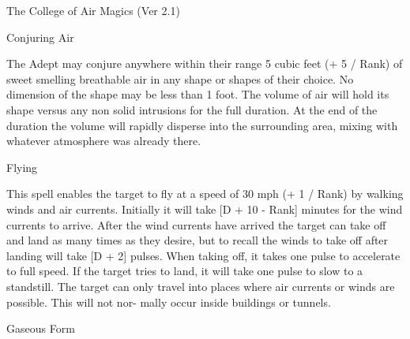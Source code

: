 \begin{Chapter}{The College of Air Magics (Ver 2.1)}
\begin{spell}[S-5]{Conjuring Air }
\begin{effects}
 The  Adept  may  conjure  anywhere  within 
their  range  5  cubic  feet  (+  5  /  Rank)  of  sweet 
smelling  breathable  air  in  any  shape  or  shapes  of 
their  choice.  No  dimension  of  the  shape  may  be 
less  than  1  foot.  The  volume  of  air  will  hold  its 
shape  versus  any  non  solid  intrusions  for  the  full 
duration. At the end of the duration the volume will 
rapidly  disperse  into  the  surrounding  area,  mixing 
with whatever atmosphere was already there. 

\end{effects}
\end{spell}

\begin{spell}[S-6]{Flying }

\begin{effects}
 This  spell  enables  the  target  to  fly  at  a 
speed  of  30  mph  (+  1  /  Rank)  by  walking  winds 
and  air  currents.  Initially  it  will  take  [D  +  10  - 
Rank]  minutes  for  the  wind  currents  to  arrive. 
After the wind currents have arrived the target can 
take off and land as many times as they desire, but 
to  recall  the  winds  to  take  off  after  landing  will 
take  [D  + 2]  pulses.  When  taking  off,  it takes  one 
pulse  to  accelerate  to  full  speed.  If  the  target  tries 
to land, it will take one pulse to slow to a standstill. 
The  target  can  only  travel  into  places  where  air 
currents  or  winds  are  possible.  This  will  not  nor-
mally occur inside buildings or tunnels. 

\end{effects}
\end{spell}

\begin{spell}[S-7]{Gaseous Form }


\end{spell}
\end{Chapter}
